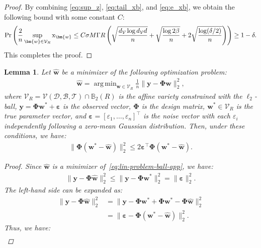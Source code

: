 \documentclass{article}
\def\rx{{\textnormal{x}}}
\DeclareMathOperator*{\argmin}{arg\,min}
\theoremstyle{plain}
\newtheorem{lemma}[theorem]{Lemma}
\theoremstyle{definition}
\theoremstyle{remark}
\begin{document}
\begin{proof}[Proof]
By combining \cref{eq:sup_z}, \cref{eq:tail_xb}, and \cref{eq:e_xb}, we obtain the following bound with some constant \(C\):
\begin{align*}
    \Pr\left(\frac{2}{n} \sup_{\bm{w} \in \mathcal{V}_R} \rx_{\bm{w}} \leq C \sigma M \Gamma R
    \left( \sqrt{\frac{d_{\mathcal{V}}\log d_{\mathcal{V}}d}{n}} + \sqrt{\frac{\log 2\beta}{n}} + 2\sqrt{\frac{\log (\delta/2)}{n}}\right) \right) \geq 1 - \delta.
\end{align*}
This completes the proof.
\end{proof}

\begin{lemma}
\label{lem:bound_Phi_beta}
Let \(\hat{\bm{w}}\) be a minimizer of the following optimization problem:
\begin{gather}
\label{eq:lin-problem-ball-app}
\hat{\bm{w}} = \argmin_{\bm{w} \in \mathcal{V}_R} \frac{1}{n} \| \bm{y} - \bm{\Phi} \bm{w} \|^2_2,
\end{gather}
where \( \mathcal{V}_R = \mathcal{V}(\mathscr{D}, \mathcal{B}, \mathcal{T}) \cap \mathbb{B}_2(R) \) is the affine variety constrained with the \(\ell_2\)-ball, \(\bm{y} = \bm{\Phi}\bm{w}^* + \bm{\varepsilon}\) is the observed vector, \(\bm{\Phi}\) is the design matrix, \(\bm{w}^* \in \mathcal{V}_R\) is the true parameter vector, and \(\bm{\varepsilon} = [\varepsilon_1, \ldots, \varepsilon_n]^{\top}\) is the noise vector with each \(\varepsilon_i\) independently following a zero-mean Gaussian distribution. Then, under these conditions, we have:
\begin{align}
\label{eq:lemma_basic_bound}
\|\bm{\Phi}(\bm{w}^* - \hat{\bm{w}})\|_2^2 \leq 2 \bm{\varepsilon}^{\top} \bm{\Phi}(\bm{w}^* - \hat{\bm{w}}).
\end{align}
\begin{proof}[Proof]
Since \(\hat{\bm{w}}\) is a minimizer of~\cref{eq:lin-problem-ball-app}, we have:
\begin{align*}
    \|\bm{y} - \bm{\Phi}\hat{\bm{w}}\|_2^2 \leq \|\bm{y} - \bm{\Phi}\bm{w}^*\|_2^2 = \|\bm{\varepsilon}\|_2^2.
\end{align*}
The left-hand side can be expanded as:
\begin{align*}
    \|\bm{y} - \bm{\Phi}\hat{\bm{w}}\|_2^2 &= \|\bm{y} - \bm{\Phi}\bm{w}^* + \bm{\Phi}\bm{w}^* - \bm{\Phi}\hat{\bm{w}}\|_2^2 \\
    &= \|\bm{\varepsilon} - \bm{\Phi}(\bm{w}^* - \hat{\bm{w}})\|_2^2.
\end{align*}
Thus, we have:
\begin{align*}

\end{align*}
\end{proof}
\end{lemma}
\end{document}
